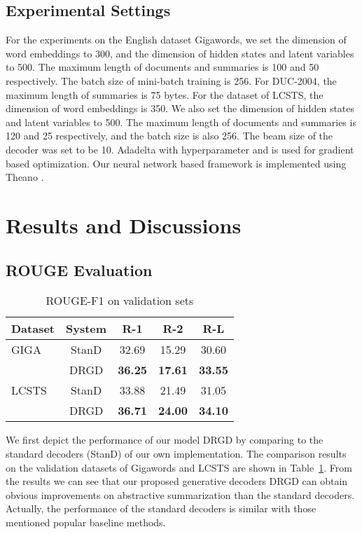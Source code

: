 \documentclass[11pt,letterpaper]{article}
\begin{document}
\subsection{Experimental Settings}
For the experiments on the English dataset Gigawords, we set the dimension of word embeddings to 300, and the dimension of hidden states and latent variables to 500.
The maximum length of documents and summaries is 100 and 50 respectively.
The batch size of mini-batch training is 256.
For DUC-2004, the maximum length of summaries is 75 bytes.
For the dataset of LCSTS, the dimension of word embeddings is 350.
We also set the dimension of hidden states and latent variables to 500.
The maximum length of documents and summaries is 120 and 25 respectively, and the batch size is also 256. 
The beam size of the decoder was set to be 10.
Adadelta \cite{schmidhuber2015deep} with hyperparameter  and  is used for gradient based optimization.
Our neural network based framework is implemented using Theano \cite{2016arXiv160502688short}.





\section{Results and Discussions}

\subsection{ROUGE Evaluation}

\begin{table}[!htb]
	\centering
	\caption{ROUGE-F1 on validation sets}
	\label{tab:rouge-stand}
	\begin{tabular}{l c c c c}
		\hline
		\textbf{Dataset} & \textbf{System}  & \textbf{R-1} & \textbf{R-2} & \textbf{R-L} \\
		\hline
		GIGA  & StanD       & 32.69 & 15.29 & 30.60  \\
		& DRGD & \textbf{36.25} & \textbf{17.61} & \textbf{33.55}  \\
		\hline
		LCSTS & StanD       & 33.88 & 21.49 & 31.05  \\
		& DRGD      & \textbf{36.71} & \textbf{24.00} & \textbf{34.10}  \\
		\hline
	\end{tabular}
\end{table}

We first depict the performance of our model DRGD by comparing to the standard decoders (StanD) of our own implementation.
The comparison results on the validation datasets of Gigawords and LCSTS are shown in Table~\ref{tab:rouge-stand}.
From the results we can see that our proposed generative decoders DRGD can obtain obvious improvements on abstractive summarization than the standard decoders.
Actually, the performance of the standard decoders is similar with those mentioned popular baseline methods.
\end{document}
